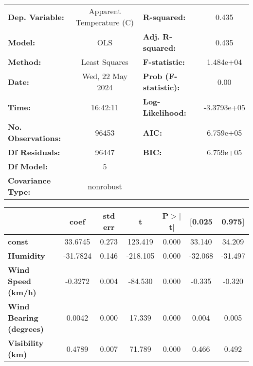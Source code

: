 \begin{center}
\begin{tabular}{lclc}
\toprule
\textbf{Dep. Variable:}         & Apparent Temperature (C) & \textbf{  R-squared:         } &      0.435   \\
\textbf{Model:}                 &           OLS            & \textbf{  Adj. R-squared:    } &      0.435   \\
\textbf{Method:}                &      Least Squares       & \textbf{  F-statistic:       } &  1.484e+04   \\
\textbf{Date:}                  &     Wed, 22 May 2024     & \textbf{  Prob (F-statistic):} &      0.00    \\
\textbf{Time:}                  &         16:42:11         & \textbf{  Log-Likelihood:    } & -3.3793e+05  \\
\textbf{No. Observations:}      &           96453          & \textbf{  AIC:               } &  6.759e+05   \\
\textbf{Df Residuals:}          &           96447          & \textbf{  BIC:               } &  6.759e+05   \\
\textbf{Df Model:}              &               5          & \textbf{                     } &              \\
\textbf{Covariance Type:}       &        nonrobust         & \textbf{                     } &              \\
\bottomrule
\end{tabular}
\begin{tabular}{lcccccc}
                                & \textbf{coef} & \textbf{std err} & \textbf{t} & \textbf{P$> |$t$|$} & \textbf{[0.025} & \textbf{0.975]}  \\
\midrule
\textbf{const}                  &      33.6745  &        0.273     &   123.419  &         0.000        &       33.140    &       34.209     \\
\textbf{Humidity}               &     -31.7824  &        0.146     &  -218.105  &         0.000        &      -32.068    &      -31.497     \\
\textbf{Wind Speed (km/h)}      &      -0.3272  &        0.004     &   -84.530  &         0.000        &       -0.335    &       -0.320     \\
\textbf{Wind Bearing (degrees)} &       0.0042  &        0.000     &    17.339  &         0.000        &        0.004    &        0.005     \\
\textbf{Visibility (km)}        &       0.4789  &        0.007     &    71.789  &         0.000        &        0.466    &        0.492     \\

\end{tabular}
\end{center}
